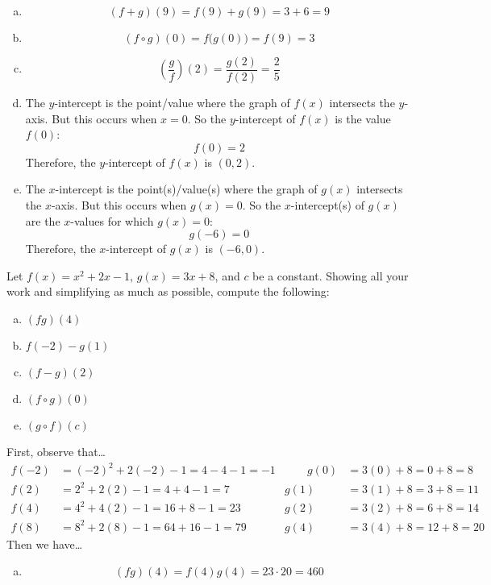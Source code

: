 \documentclass[12pt,letterpaper]{exam}
\begin{document}
\begin{questions}
\sol 
\begin{enumerate}[(a)]
\item 
	\[
	(f + g)(9)= f(9) + g(9)= 3 + 6= 9
	\] \pspace

\item 
	\[
	(f \circ g)(0)= f \big( g(0) \big)= f(9)= 3
	\] \pspace

\item 
	\[
	\left( \dfrac{g}{f} \right)(2)= \dfrac{g(2)}{f(2)}= \dfrac{2}{5}
	\] \pspace

\item The $y$-intercept is the point/value where the graph of $f(x)$ intersects the $y$-axis. But this occurs when $x= 0$. So the $y$-intercept of $f(x)$ is the value $f(0)$:
	\[
	f(0)= 2
	\]
Therefore, the $y$-intercept of $f(x)$ is $(0, 2)$. \pspace

\item The $x$-intercept is the point(s)/value(s) where the graph of $g(x)$ intersects the $x$-axis. But this occurs when $g(x)= 0$. So the $x$-intercept(s) of $g(x)$ are the $x$-values for which $g(x)= 0$:
	\[
	g(-6)= 0
	\]
Therefore, the $x$-intercept of $g(x)$ is $(-6, 0)$. 
\end{enumerate}



\newpage
\question[10] Let $f(x)= x^2 + 2x - 1$, $g(x)= 3x + 8$, and $c$ be a constant. Showing all your work and simplifying as much as possible, compute the following:
	\begin{enumerate}[(a)]
	\item $(fg)(4)$
	\item $f(-2) - g(1)$
	\item $(f - g)(2)$
	\item $(f \circ g)(0)$
	\item $(g \circ f)(c)$
	\end{enumerate} \pspace

\sol First, observe that\dots
	\[
	\begin{aligned}
	f(-2)&= (-2)^2 + 2(-2) - 1= 4 - 4 - 1= -1 &\qquad g(0)&=  3(0) + 8= 0 + 8= 8 \\
	f(2)&= 2^2 + 2(2) - 1= 4 + 4 - 1= 7 & g(1)&= 3(1) + 8= 3 + 8= 11 \\
	f(4)&= 4^2 + 4(2) - 1= 16 + 8 - 1= 23 & g(2)&= 3(2) + 8= 6 + 8= 14 \\
	f(8)&= 8^2 + 2(8) - 1= 64 + 16 - 1= 79 & g(4)&= 3(4) + 8= 12 + 8= 20
	\end{aligned}
	\]
Then we have\dots
        \begin{enumerate}[(a)]
 	       \item 
    	    	\[
        		(fg)(4)= f(4) g(4)= 23 \cdot 20= 460
        		\] \pspace
        

\end{enumerate}
\end{questions}
\end{document}
